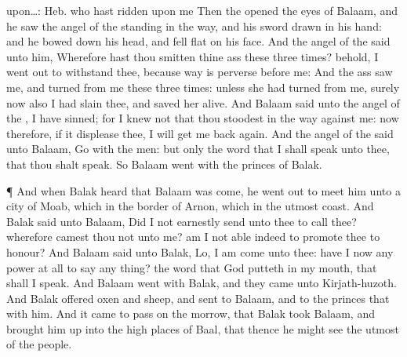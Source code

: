 {{upon…: Heb. who hast ridden upon me}
Then the
{}
opened the
eyes of
Balaam, and he
saw the
angel of the
{}
standing in the
way, and his
sword
drawn in his
hand: and he bowed
down his head, and fell
flat on his
face.
And the
angel of the
{}
said unto him, Wherefore hast thou
smitten thine
ass these
three
times? behold, I went
out to
withstand thee, because
{}
way is
perverse before me:
And the
ass
saw me, and
turned from
me these
three
times:
unless she had
turned from
me, surely now also I had
slain thee, and saved her
alive.
And
Balaam
said unto the
angel of the
{}, I have
sinned; for I
knew not that thou
stoodest in the
way
against me: now therefore, if it displease
thee, I will get me back
again.
And the
angel of the
{}
said unto
Balaam,
Go with the
men: but
only the
word that I shall
speak unto thee, that thou shalt
speak. So
Balaam
went with the
princes of
Balak.
\par }{\PP {}¶ And when
Balak
heard that
Balaam was
come, he went
out to
meet him unto a
city of
Moab, which
{} in the
border of
Arnon, which
{} in the
utmost
coast.
And
Balak
said unto
Balaam, Did I not
earnestly
send unto thee to
call thee? wherefore
camest thou not unto me? am I not
able
indeed to promote thee to
honour?
And
Balaam
said unto
Balak, Lo, I am
come unto thee: have I now any
power at
all to
say any
thing? the
word that
God
putteth in my
mouth, that shall I
speak.
And
Balaam
went with
Balak, and they
came unto
Kirjath-huzoth.
And
Balak
offered
oxen and
sheep, and
sent to
Balaam, and to the
princes that
{} with him.
And it came to pass on the
morrow, that
Balak
took
Balaam, and brought him
up into the high
places of
Baal, that thence he might
see the
utmost
{} of the
people.

}
